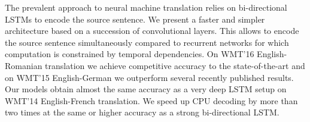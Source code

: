 The prevalent approach to neural machine translation relies on bi-directional LSTMs to encode the source sentence. We present a faster and simpler architecture based on a succession of convolutional layers. This allows to encode the source sentence simultaneously compared to recurrent networks for which computation is constrained by temporal dependencies. On WMT'16 English-Romanian translation we achieve competitive accuracy to the state-of-the-art and on WMT'15 English-German we outperform several recently published results. Our models obtain almost the same accuracy as a very deep LSTM setup on WMT'14 English-French translation. We speed up CPU decoding by more than two times at the same or higher accuracy as a strong bi-directional LSTM.
